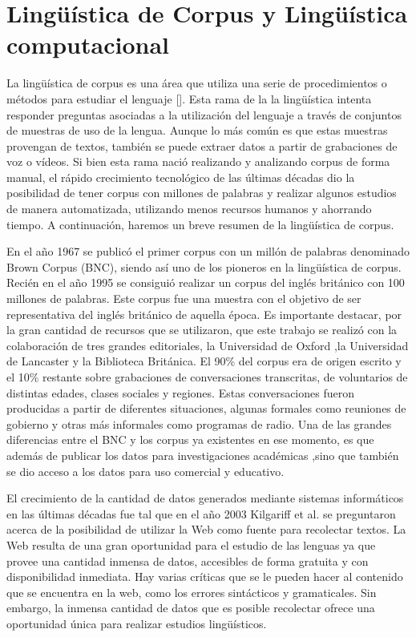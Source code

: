 

\section{Lingüística de Corpus y Lingüística computacional} %
\label{linguistica_computacional}

La lingüística de corpus es una área que utiliza una serie de procedimientos o métodos para estudiar el lenguaje [\cite{mcenery2011corpus}]. Esta rama de la la lingüística intenta responder 
preguntas asociadas a la utilización del lenguaje a través de conjuntos de muestras de uso de la lengua. Aunque lo más común es que estas muestras provengan de textos, también se puede extraer datos a partir de grabaciones de voz o vídeos. Si bien esta rama nació realizando y analizando corpus de forma manual, el rápido crecimiento
tecnológico de las últimas décadas dio la posibilidad de tener corpus con millones de palabras y realizar algunos estudios de manera automatizada, utilizando menos recursos humanos y ahorrando tiempo. A continuación, haremos un breve resumen de la lingüística de corpus.

En el año 1967 se publicó el primer corpus con un millón de palabras denominado Brown Corpus (BNC), siendo así uno de los pioneros en la lingüística de corpus. Recién en el año 1995 se consiguió realizar un corpus del inglés británico con 100 millones de palabras. 
Este corpus fue una muestra con el objetivo de ser representativa del inglés británico de aquella época. 
Es importante destacar, por la gran cantidad de recursos que se utilizaron, que este trabajo se realizó con la colaboración de tres grandes editoriales, la Universidad de Oxford ,la Universidad de Lancaster y la Biblioteca Británica. 
El 90\% del corpus era de origen escrito y el 10\% restante sobre grabaciones de conversaciones transcritas, de voluntarios de distintas edades, clases sociales y regiones. 
Estas conversaciones fueron producidas a partir de diferentes situaciones, algunas formales como reuniones de gobierno y otras más informales como programas de radio. 
Una de las grandes diferencias entre el BNC y los corpus ya existentes en ese momento, es que además de publicar los datos para investigaciones académicas ,sino que también se dio acceso a los datos para uso comercial y educativo.

El crecimiento de la cantidad de datos generados mediante sistemas informáticos en las últimas décadas fue tal que en el año 2003 Kilgariff et al. \cite{kilgarriff2003introduction} se preguntaron acerca de la posibilidad de utilizar la Web como fuente para recolectar textos.
La Web resulta de una gran oportunidad para el estudio de las lenguas ya que provee una cantidad inmensa de datos, accesibles de forma gratuita y con disponibilidad inmediata. Hay varias críticas que se le pueden hacer al contenido que se encuentra en la web, como los errores sintácticos y  gramaticales. Sin embargo, la inmensa cantidad de datos que es posible recolectar ofrece una oportunidad única para realizar estudios lingüísticos.

